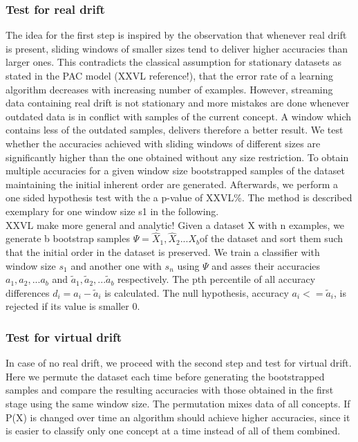 \documentclass[conference]{IEEEtran}
\begin{document}
\subsubsection{Test for real drift}
The idea for the first step is inspired by the observation that whenever real drift is present, sliding windows of smaller sizes tend to deliver higher accuracies than larger ones. 
This contradicts the classical assumption for stationary datasets as stated in the PAC model (XXVL reference!), that the error rate of a learning algorithm decreases
with increasing number of examples. 
However, streaming data containing real drift is not stationary and more mistakes are done whenever outdated data is in conflict with samples of the current concept. 
A window which contains less of the outdated samples, delivers therefore a better result.
We test whether the accuracies achieved with sliding windows of different sizes are significantly higher than the one obtained without any size restriction. 
To obtain multiple accuracies for a given window size bootstrapped samples of the dataset maintaining the initial inherent order are generated. 
Afterwards, we perform a one sided hypothesis test with the a p-value of XXVL\%.
The method is described exemplary for one window size s1 in the following.\\
XXVL make more general and analytic!
Given a dataset X with n examples, we generate b bootstrap samples $\Psi=\hat{X}_1,\hat{X}_2...{X}_b$of the dataset and sort them such that the initial order in the dataset is preserved. 
We train a classifier with window size $s_1$ and another one with $s_n$ using $\Psi$ and asses their accuracies $a_1,a_2,...a_b$ and $\tilde{a}_1,\tilde{a}_2,...\tilde{a}_b$ respectively.  
The pth percentile of all accuracy differences $d_i = a_i - \tilde{a}_i$ is calculated. The null hypothesis, accuracy $a_i <= \tilde{a}_i$, is rejected if its value is smaller 0.\\
\subsubsection{Test for virtual drift}
In case of no real drift, we proceed with the second step and test for virtual drift. Here we permute the dataset each time before generating the bootstrapped samples and compare
the resulting accuracies with those obtained in the first stage using the same window size. The permutation mixes data of all concepts. If P(X) is changed over time an 
algorithm should achieve higher accuracies, since it is easier to classify only one concept at a time instead of all of them combined.\\
\end{document}
